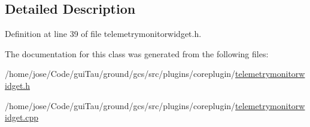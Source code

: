 \subsection{Detailed Description}


Definition at line 39 of file telemetrymonitorwidget.\-h.



The documentation for this class was generated from the following files\-:\begin{DoxyCompactItemize}
\item 
/home/jose/\-Code/gui\-Tau/ground/gcs/src/plugins/coreplugin/\hyperlink{telemetrymonitorwidget_8h}{telemetrymonitorwidget.\-h}\item 
/home/jose/\-Code/gui\-Tau/ground/gcs/src/plugins/coreplugin/\hyperlink{telemetrymonitorwidget_8cpp}{telemetrymonitorwidget.\-cpp}\end{DoxyCompactItemize}
